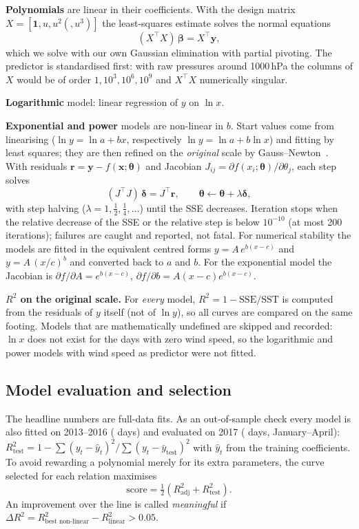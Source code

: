\documentclass[11pt,a4paper]{article}
\newcommand{\Rsq}{R^2}
\begin{document}
\textbf{Polynomials} are linear in their coefficients. With the design matrix
$X=[\mathbf 1,u,u^2(,u^3)]$ the least-squares estimate solves the normal equations
\[
  (X^\top X)\,\boldsymbol\beta = X^\top \mathbf y ,
\]
which we solve with our own Gaussian elimination with partial pivoting. The
predictor is standardised first: with raw pressures around 1000\,hPa the columns
of $X$ would be of order $1,10^3,10^6,10^9$ and $X^\top X$ numerically singular.

\textbf{Logarithmic} model: linear regression of $y$ on $\ln x$.

\textbf{Exponential and power} models are non-linear in $b$. Start values come
from linearising ($\ln y=\ln a+bx$, respectively $\ln y=\ln a+b\ln x$) and fitting
by least squares; they are then refined on the \emph{original} scale by
Gauss--Newton~\cite{bates}. With residuals $\mathbf r=\mathbf y-f(\mathbf x;\boldsymbol\theta)$
and Jacobian $J_{ij}=\partial f(x_i;\boldsymbol\theta)/\partial\theta_j$, each step solves
\[
  (J^\top J)\,\boldsymbol\delta = J^\top \mathbf r ,\qquad
  \boldsymbol\theta \leftarrow \boldsymbol\theta+\lambda\boldsymbol\delta ,
\]
with step halving ($\lambda=1,\tfrac12,\tfrac14,\dots$) until the SSE decreases.
Iteration stops when the relative decrease of the SSE or the relative step is
below $10^{-10}$ (at most 200 iterations); failures are caught and reported, not
fatal. For numerical stability the models are fitted in the equivalent centred
forms $y=A\,e^{b(x-c)}$ and $y=A\,(x/c)^b$ and converted back to $a$ and $b$. For
the exponential model the Jacobian is
$\partial f/\partial A=e^{b(x-c)}$, $\partial f/\partial b=A(x-c)e^{b(x-c)}$.

\textbf{$\Rsq$ on the original scale.} For \emph{every} model,
$\Rsq=1-\mathrm{SSE}/\mathrm{SST}$ is computed from the residuals of $y$ itself (not
of $\ln y$), so all curves are compared on the same footing. Models that are
mathematically undefined are skipped and recorded: $\ln x$ does not exist for the
\nWindZero{} days with zero wind speed, so the logarithmic and power models with
wind speed as predictor were not fitted.

\subsection{Model evaluation and selection}
\label{sec:selection}
The headline numbers are full-data fits. As an out-of-sample check every model
is also fitted on 2013--2016 (\nTrainPeriod{} days) and evaluated on 2017
(\nTestPeriod{} days, January--April):
$\Rsq_{\text{test}}=1-\sum(y_t-\hat y_t)^2/\sum(y_t-\bar y_{\text{test}})^2$ with
$\hat y_t$ from the training coefficients. To avoid rewarding a polynomial merely
for its extra parameters, the curve selected for each relation maximises
\[
  \text{score}=\tfrac12\left(\Rsq_{\mathrm{adj}}+\Rsq_{\text{test}}\right).
\]
An improvement over the line is called \emph{meaningful} if
$\Delta\Rsq=\Rsq_{\text{best non-linear}}-\Rsq_{\text{linear}}>0.05$.
\end{document}
